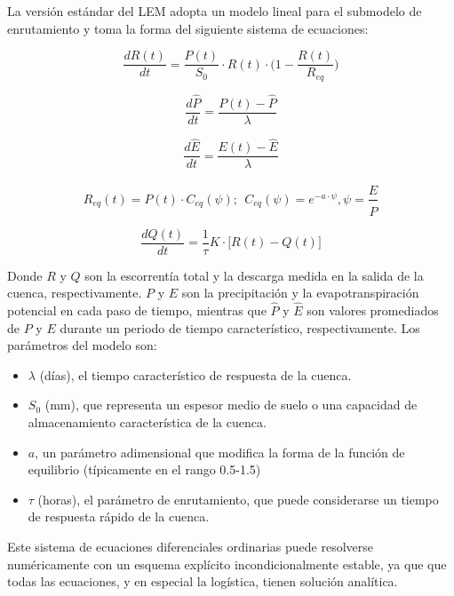 La versión estándar del LEM adopta un modelo lineal para el submodelo de enrutamiento y toma la forma del siguiente sistema de 
ecuaciones:


\begin{equation}
    \frac{d R(t)}{dt}=\frac{P(t)}{S_0}\cdot R(t)\cdot\big(1-\frac{R(t)}{R_{eq}}\big)
\end{equation}

\begin{equation}
    \frac{d \hat{P}}{dt}=\frac{P(t)-\hat{P}}{\lambda}
\end{equation}


\begin{equation}
    \frac{d \hat{E}}{dt}=\frac{E(t)-\hat{E}}{\lambda}
\end{equation}


\begin{equation}
    R_{eq}(t)=P(t)\cdot C_{eq}(\psi);\ \ C_{eq}(\psi)=e^{-a\cdot \psi}, \psi=\frac{\hat{E}}{\hat{P}}
\end{equation}


\begin{equation}
    \frac{d Q(t)}{dt}=\frac{1}{\tau}K\cdot \big[R(t)-Q(t)\big]
\end{equation}


Donde $R$ y $Q$ son la escorrentía total y la descarga medida en la salida de la cuenca, respectivamente. 
$P$ y $E$ son la precipitación y la evapotranspiración potencial en cada paso de tiempo, mientras que $\hat{P}$ y $\hat{E}$ 
son valores promediados de $P$ y $E$ durante un periodo de tiempo característico, respectivamente. 
Los parámetros del modelo son:
\begin{itemize}
    \item $\lambda$ (días), el tiempo característico de respuesta  de la cuenca. %
    \item $S_0$ (mm), que representa un espesor medio de suelo o una capacidad de almacenamiento característica de la cuenca.
    \item $a$, un parámetro adimensional que modifica la forma de la función de equilibrio (típicamente en el rango 0.5-1.5)
    \item $\tau$ (horas), el parámetro de enrutamiento, que puede considerarse un tiempo 
    de respuesta rápido de la cuenca.
\end{itemize}
Este sistema de ecuaciones diferenciales ordinarias puede resolverse numéricamente con un esquema explícito 
incondicionalmente estable, ya que  que todas las ecuaciones, y en especial la logística, tienen solución analítica.

